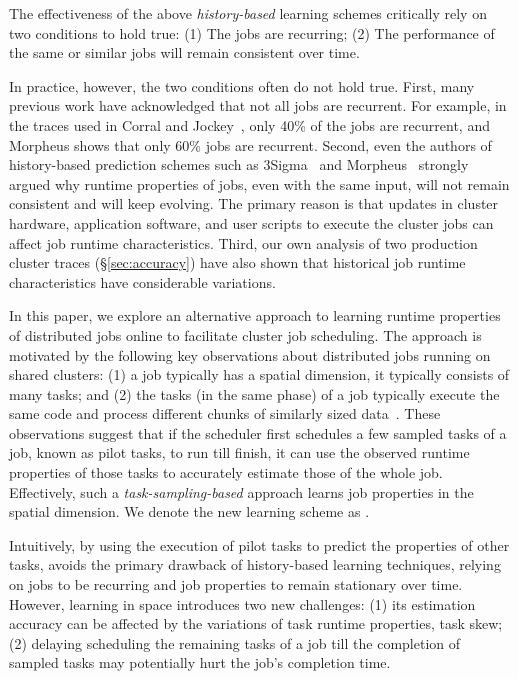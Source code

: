 The effectiveness of the above {\em history-based} learning schemes
critically rely on two conditions to hold true: 
(1) The jobs are recurring; (2) The performance of the same or
similar jobs will remain consistent over time.

In practice, however, the two conditions often do not hold true.
First, many previous work have acknowledged that not all jobs are
recurrent. For example, in the traces used in Corral \cite{corral} and
Jockey~\cite{jockey:eurosys2012}, only
40\% of the jobs are recurrent, and Morpheus \cite{morpheus} shows that
only 60\% jobs are recurrent.
%
Second, even the authors of history-based prediction schemes such as
3Sigma~\cite{3Sigma} and Morpheus~\cite{morpheus} strongly argued why
runtime properties of jobs, even with the same input, will not remain
consistent and will keep evolving. The primary reason is that updates
in cluster hardware, application software, and user scripts to execute
the cluster jobs can affect job runtime characteristics.
%
Third, our own analysis of two production cluster traces (\S\ref{sec:accuracy}) have also shown that historical job runtime
characteristics have considerable variations.

In this paper, we explore an alternative approach to learning runtime
properties of distributed jobs online to facilitate cluster
job scheduling.
%
The approach is motivated by the following key observations about
distributed jobs running on shared clusters: (1) a job typically has a
spatial dimension, \ie it typically consists of many tasks; and (2)
the tasks (in the same phase) of a job typically execute the same code
and process different chunks of similarly sized
data~\cite{googleClusterData2011-2Schema,
  personalCommunication:MarkAstley}.  These observations suggest that
if the scheduler first schedules a few sampled tasks of a job, known as
pilot tasks, to run till finish, it can use the observed runtime
properties of those tasks to accurately estimate those of the whole
job.  Effectively, such a {\em task-sampling-based} approach learns job
properties in the spatial dimension.  We denote the new learning
scheme as \slearn.

Intuitively, by using the execution of pilot tasks to predict the
properties of other tasks, \lTechnique avoids the primary drawback of
history-based learning techniques, \ie relying on jobs to be recurring
and job properties to remain stationary over time.  However, learning
in space introduces two new challenges: (1) its estimation accuracy
can be affected by the variations of task runtime properties, \ie task skew; 
(2) delaying scheduling the remaining tasks of a job till the
completion of sampled tasks may potentially hurt the job's completion
time.

